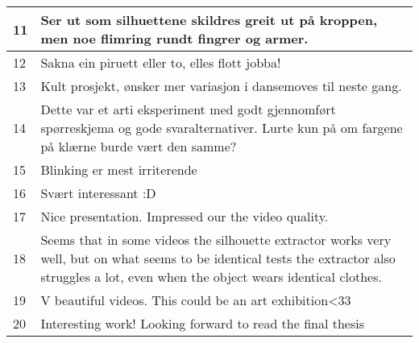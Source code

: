 \begin{longtable}{p{0.5cm}p{11cm}}
        \hline
        11 & Ser ut som silhuettene skildres greit ut på kroppen, men noe flimring rundt fingrer og armer. \\
        \hline
        12 & Sakna ein piruett eller to, elles flott jobba!\\
        \hline
        13 & Kult prosjekt, ønsker mer variasjon i dansemoves til neste gang.\\
        \hline
        14 & Dette var et arti eksperiment med godt gjennomført spørreskjema og gode svaralternativer. Lurte kun på om fargene på klærne burde vært den samme? \\
        \hline
        15 & Blinking er mest irriterende \\
        \hline
        16 & Svært interessant :D \\
        \hline
        17 & Nice presentation. Impressed our the video quality. \\
        \hline
        18 & Seems that in some videos the silhouette extractor works very well, but on what seems to be identical tests the extractor also struggles a lot, even when the object wears identical clothes. \\
        \hline
        19 & V beautiful videos. This could be an art exhibition<33 \\
        \hline
        20 & Interesting work! Looking forward to read the final thesis \\
        \hline
\end{longtable}